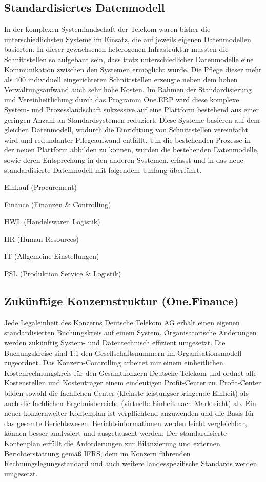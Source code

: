 \subsection{Standardisiertes Datenmodell}
In der komplexen Systemlandschaft der Telekom waren bisher die unterschiedlichsten Systeme im Einsatz, die auf jeweils eigenen Datenmodellen basierten. 
In dieser gewachsenen heterogenen Infrastruktur mussten die Schnittstellen so aufgebaut sein, dass trotz unterschiedlicher Datenmodelle eine Kommunikation zwischen den Systemen ermöglicht wurde. Die Pflege dieser mehr als 400 individuell eingerichteten Schnittstellen erzeugte neben dem hohen Verwaltungsaufwand auch sehr hohe Kosten.
Im Rahmen der Standardisierung und Vereinheitlichung durch das Programm One.ERP wird diese komplexe System- und Prozesslandschaft sukzessive auf eine Plattform bestehend aus einer geringen Anzahl an Standardsystemen reduziert. Diese Systeme basieren auf dem gleichen Datenmodell, wodurch die Einrichtung von Schnittstellen vereinfacht wird und redundanter Pflegeaufwand entfällt.
Um die bestehenden Prozesse in der neuen Plattform abbilden zu können, wurden die bestehenden Datenmodelle, sowie deren Entsprechung in den anderen Systemen, erfasst und in das neue standardisierte Datenmodell mit folgendem Umfang überführt.
\begin{compactitem}    
\item    Einkauf (Procurement)
\item    Finance (Finanzen \& Controlling)
\item    HWL (Handelswaren Logistik)
\item    HR (Human Resources)
\item    IT (Allgemeine Einstellungen)
\item    PSL (Produktion Service \& Logistik)
\end{compactitem}

\subsection{Zukünftige Konzernstruktur (One.Finance)}
Jede Legaleinheit des Konzerns Deutsche Telekom AG erhält einen eigenen standardisierten Buchungskreis auf einem System. Organisatorische Änderungen werden zukünftig System- und Datentechnisch effizient umgesetzt. Die Buchungskreise sind 1:1 den Gesellschaftsnummern im Organisationsmodell zugeordnet.
Das Konzern-Controlling arbeitet mir einem einheitlichen Kostenrechnungskreis für den Gesamtkonzern Deutsche Telekom und ordnet alle Kostenstellen und Kostenträger einem eindeutigen Profit-Center zu. Profit-Center bilden sowohl die fachlichen Center (kleinste leistungserbringende Einheit) als auch die fachlichen Ergebnisbereiche (virtuelle Einheit nach Marktsicht) ab.
Ein neuer konzernweiter Kontenplan ist verpflichtend anzuwenden und die Basis für das gesamte Berichtswesen. Berichtsinformationen werden leicht vergleichbar, können besser analysiert und ausgetauscht werden.
Der standardisierte Kontenplan erfüllt die Anforderungen zur Bilanzierung und externen Berichterstattung gemäß IFRS, dem im Konzern führenden Rechnungslegungsstandard und auch weitere landesspezifische Standards werden umgesetzt.

